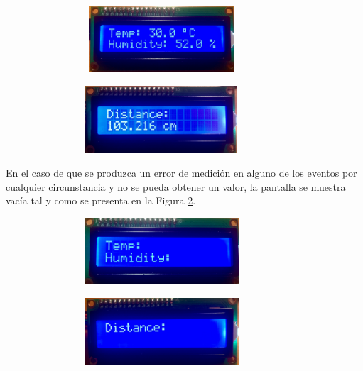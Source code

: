 \documentclass[12pt,a4paper, twoside]{report}
\begin{document}
	\begin{figure}[!ht]		
		\caption{Prototipo hardware Hyot - Otro ejemplo de medición.}
 		\begin{subfigure}{0.5\textwidth}
 			\hbox{
 				\hspace{0cm}
 				\includegraphics[width=7cm, height=2.5cm]{Images/hardware/lcd1_measurement2} 
 			}
		\end{subfigure}
		\begin{subfigure}{0.5\textwidth}
			\hbox{
 				\hspace{1cm}
				\includegraphics[width=7cm, height=2.5cm]{Images/hardware/lcd2_measurement2}
			}
		\end{subfigure}
		\label{fig:hardware_measurement2}
	\end{figure}
	
	En el caso de que se produzca un error de medición en alguno de los eventos por cualquier circunstancia y no se pueda obtener un valor, la pantalla se muestra vacía tal y como se presenta en la Figura \ref{fig:hardware_measurement_empty}.
	
	\newpage
	
	\begin{figure}[!ht]		
		\caption{Prototipo hardware Hyot - Ejemplo de medición errónea.}
 		\begin{subfigure}{0.5\textwidth}
 			\hbox{
 				\hspace{0cm}
 				\includegraphics[width=7cm, height=2.5cm]{Images/hardware/lcd1_measurement_empty} 
 			}
		\end{subfigure}
		\begin{subfigure}{0.5\textwidth}
			\hbox{
 				\hspace{1cm}
				\includegraphics[width=7cm, height=2.5cm]{Images/hardware/lcd2_measurement_empty}
			}
		\end{subfigure}
		\label{fig:hardware_measurement_empty}
	\end{figure}
	
\end{document}
